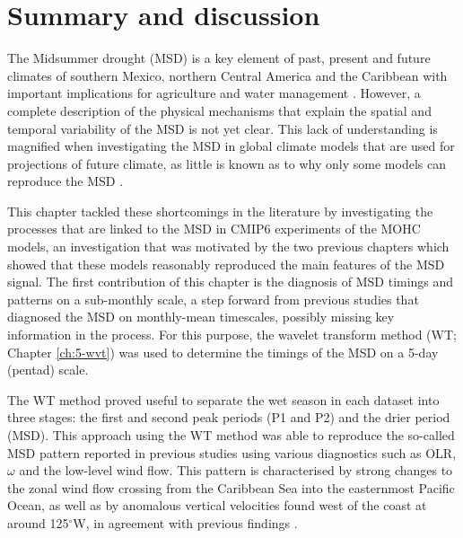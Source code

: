 \section{Summary and discussion}\label{sq:sumdiscuss}

The Midsummer drought (MSD) is a key element of past, present and future climates of southern Mexico, northern Central America and the Caribbean with important implications for agriculture and water management \citep{hellin2017,de2018,harvey2018}. However, a complete description of the physical mechanisms that explain the spatial and temporal variability of the MSD is not yet clear. This lack of understanding is magnified when investigating the MSD in global climate models that are used for projections of future climate, as little is known as to why only some models can reproduce the MSD \citep{ryu2014}.


This chapter tackled these shortcomings in the literature by investigating the processes that are linked to the MSD in CMIP6 experiments of the MOHC models, an investigation that was motivated by the two previous chapters which showed that these models reasonably reproduced the main features of the MSD signal.
The first contribution of this chapter is the diagnosis of MSD timings and patterns on a sub-monthly scale, a step forward from previous studies that diagnosed the MSD on monthly-mean timescales, possibly missing key information in the process. 
For this purpose, the wavelet transform method (WT; Chapter \ref{ch:5-wvt}) was used to determine the timings of the MSD on a 5-day (pentad) scale. 


The WT method proved useful to separate the wet season in each dataset into three stages: the first and second peak periods (P1 and P2) and the drier period (MSD). 
This approach using the WT method was able to reproduce the so-called MSD pattern reported in previous studies \citep{zermeno2019,zhao2020} using various diagnostics such as OLR, $\omega$ and the low-level wind flow. This pattern is characterised by strong changes to the zonal wind flow crossing from the Caribbean Sea into the easternmost Pacific Ocean, as well as by anomalous vertical velocities found west of the coast at around 125$^\circ$W, in agreement with previous findings \citep{herrera2015,zermeno2019}. 

